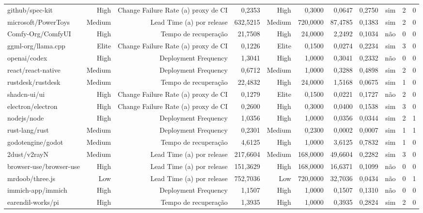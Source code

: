 \begin{tabular}{lrrrrrrrrrr}
github/spec-kit & High & Change Failure Rate (a) proxy de CI & 0,2353 & High & 0,3000 & 0,0647 & 0,2750 & sim & 2 & 0 \\
microsoft/PowerToys & Medium & Lead Time (a) por release & 632,5215 & Medium & 720,0000 & 87,4785 & 0,1383 & sim & 2 & 0 \\
Comfy-Org/ComfyUI & High & Tempo de recuperação & 21,7508 & High & 24,0000 & 2,2492 & 0,1034 & não & 0 & 0 \\
ggml-org/llama.cpp & Elite & Change Failure Rate (a) proxy de CI & 0,1226 & Elite & 0,1500 & 0,0274 & 0,2234 & sim & 3 & 0 \\
openai/codex & High & Deployment Frequency & 1,3041 & High & 1,0000 & 0,3041 & 0,2332 & não & 0 & 0 \\
react/react-native & Medium & Deployment Frequency & 0,6712 & Medium & 1,0000 & 0,3288 & 0,4898 & sim & 2 & 0 \\
rustdesk/rustdesk & Medium & Tempo de recuperação & 22,4832 & High & 24,0000 & 1,5168 & 0,0675 & sim & 1 & 0 \\
shadcn-ui/ui & High & Change Failure Rate (a) proxy de CI & 0,1279 & Elite & 0,1500 & 0,0221 & 0,1727 & não & 2 & 0 \\
electron/electron & High & Change Failure Rate (a) proxy de CI & 0,2600 & High & 0,3000 & 0,0400 & 0,1538 & sim & 3 & 0 \\
nodejs/node & High & Deployment Frequency & 1,0356 & High & 1,0000 & 0,0356 & 0,0344 & sim & 2 & 1 \\
rust-lang/rust & Medium & Deployment Frequency & 0,2301 & Medium & 0,2300 & 0,0002 & 0,0007 & sim & 1 & 1 \\
godotengine/godot & Medium & Tempo de recuperação & 4,6125 & High & 1,0000 & 3,6125 & 0,7832 & sim & 1 & 0 \\
2dust/v2rayN & Medium & Lead Time (a) por release & 217,6604 & Medium & 168,0000 & 49,6604 & 0,2282 & sim & 3 & 0 \\
browser-use/browser-use & High & Lead Time (a) por release & 151,3629 & High & 168,0000 & 16,6371 & 0,1099 & não & 0 & 0 \\
mrdoob/three.js & Low & Lead Time (a) por release & 752,7036 & Low & 720,0000 & 32,7036 & 0,0434 & não & 0 & 1 \\
immich-app/immich & High & Deployment Frequency & 1,1507 & High & 1,0000 & 0,1507 & 0,1310 & não & 0 & 0 \\
earendil-works/pi & High & Tempo de recuperação & 1,3935 & High & 1,0000 & 0,3935 & 0,2824 & sim & 2 & 0 \\

\end{tabular}
